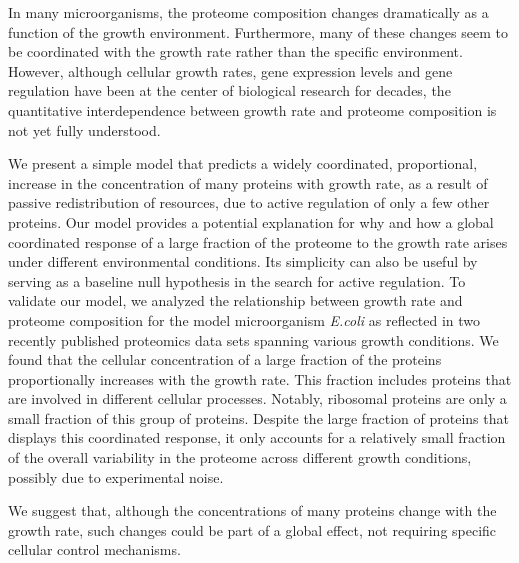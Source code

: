 In many microorganisms, the proteome composition changes dramatically as a function of the growth environment.
Furthermore, many of these changes seem to be coordinated with the growth rate rather than the specific environment.
However, although cellular growth rates, gene expression levels and gene regulation have been at the center of biological research for decades, the quantitative interdependence between growth rate and proteome composition is not yet fully understood.

We present a simple model that predicts a widely coordinated, proportional, increase in the concentration of many proteins with growth rate, as a result of passive redistribution of resources, due to active regulation of only a few other proteins.
Our model provides a potential explanation for why and how a global coordinated response of a large fraction of the proteome to the growth rate arises under different environmental conditions.
Its simplicity can also be useful by serving as a baseline null hypothesis in the search for active regulation.
To validate our model, we analyzed the relationship between growth rate and proteome composition for the model microorganism \emph{E.coli} as reflected in two recently published proteomics data sets spanning various growth conditions.
We found that the cellular concentration of a large fraction of the proteins proportionally increases with the growth rate.
This fraction includes proteins that are involved in different cellular processes.
Notably, ribosomal proteins are only a small fraction of this group of proteins.
Despite the large fraction of proteins that displays this coordinated response, it only accounts for a relatively small fraction of the overall variability in the proteome across different growth conditions, possibly due to experimental noise.

We suggest that, although the concentrations of many proteins change with the growth rate, such changes could be part of a global effect, not requiring specific cellular control mechanisms.